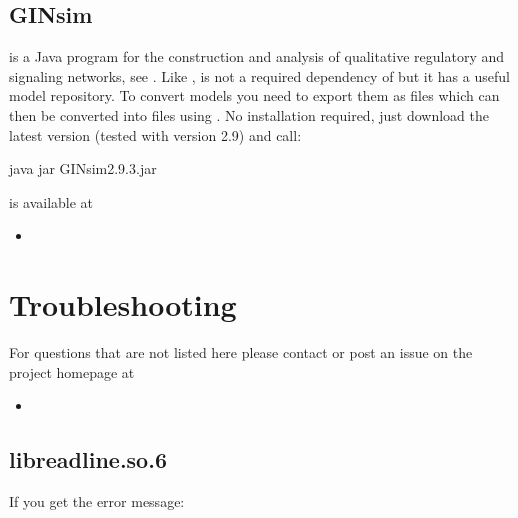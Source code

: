 \documentclass[letterpaper,10pt,english]{sphinxmanual}
\begin{document}
\subsection{GINsim}
\label{\detokenize{Installation:installation-ginsim}}\label{\detokenize{Installation:ginsim}}
 is a Java program for the construction and analysis of qualitative regulatory and signaling networks, see {\hyperref[\detokenize{Bibliography:chaouiya2012}]{}}.
Like ,  is not a required dependency of  but it has a useful model repository. To convert  models you need to export them as  files which can then be converted into  files using .
No installation required, just download the latest version (tested with version 2.9) and call:

\begin{sphinxVerbatim}[commandchars=\\\{\}]
\PYGZdl{} java \PYGZhy{}jar GINsim\PYGZhy{}2.9.3.jar
\end{sphinxVerbatim}

 is available at
\begin{itemize}
\item {} 

\end{itemize}


\section{Troubleshooting}
\label{\detokenize{Installation:installation-troubleshooting}}\label{\detokenize{Installation:troubleshooting}}
For questions that are not listed here please contact  or post an issue on the project homepage at
\begin{itemize}
\item {} 

\end{itemize}


\subsection{libreadline.so.6}
\label{\detokenize{Installation:libreadline-so-6}}
If you get the error message:
\end{document}
